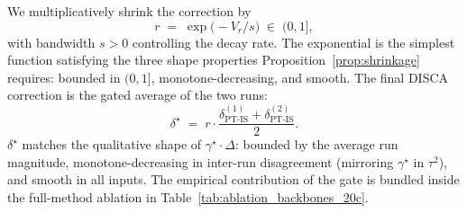 \documentclass{article}
\begin{document}
We multiplicatively shrink the correction by
\begin{equation}
r \;=\; \exp\!\bigl(-V_r / s\bigr) \;\in\; (0, 1],
\label{eq:gate}
\end{equation}
with bandwidth $s > 0$ controlling the decay rate. The 
exponential is the simplest function satisfying the three shape 
properties Proposition~\ref{prop:shrinkage} requires: bounded 
in $(0, 1]$, monotone-decreasing, and smooth. The final DISCA 
correction is the gated average of the two runs:
\begin{equation}
\delta^\star \;=\; r \cdot \frac{\delta^{(1)}_{\text{PT-IS}} + 
\delta^{(2)}_{\text{PT-IS}}}{2}.
\label{eq:disca}
\end{equation}
$\delta^\star$ matches the qualitative shape of $\gamma^\star 
\cdot \Delta$: bounded by the average run magnitude, 
monotone-decreasing in inter-run disagreement (mirroring 
$\gamma^\star$ in $\tau^2$), and smooth in all inputs. The 
empirical contribution of the gate is bundled inside the 
full-method ablation in 
Table~\ref{tab:ablation_backbones_20c}.


\end{document}
